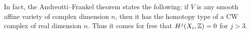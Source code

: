 \begin{remark}
In fact, the Andreotti--Frankel theorem \cite{andreotti_affinecw} states the following: if $V$ is any smooth affine variety of complex dimension $n$, then it has the homotopy type of a CW complex of real dimension $n$. Thus it comes for free that $H^j(X_i,\mathbb{Z})=0$ for $j > 3$.
\end{remark}
 